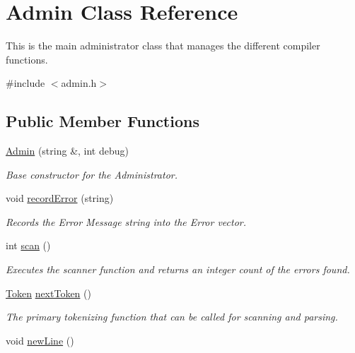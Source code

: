 \hypertarget{classAdmin}{
\section{Admin Class Reference}
\label{classAdmin}
}


This is the main administrator class that manages the different compiler functions.  




{\ttfamily \#include $<$admin.h$>$}

\subsection*{Public Member Functions}
\begin{DoxyCompactItemize}
\item 
\hyperlink{classAdmin_a1483f37673aa04863e86a37b8c493733}{Admin} (string \&, int debug)
\begin{DoxyCompactList}\small\item\em Base constructor for the Administrator. \item\end{DoxyCompactList}\item 
void \hyperlink{classAdmin_a6519bde7fd1ffd997a66987c2417d7bd}{recordError} (string)
\begin{DoxyCompactList}\small\item\em Records the Error Message string into the Error vector. \item\end{DoxyCompactList}\item 
int \hyperlink{classAdmin_aaa4f711e8151dceab8d90c5f127c6820}{scan} ()
\begin{DoxyCompactList}\small\item\em Executes the scanner function and returns an integer count of the errors found. \item\end{DoxyCompactList}\item 
\hyperlink{classToken}{Token} \hyperlink{classAdmin_a7d32bf0c9bcc29be8f622e9b07cfb3d8}{nextToken} ()
\begin{DoxyCompactList}\small\item\em The primary tokenizing function that can be called for scanning and parsing. \item\end{DoxyCompactList}\item 
void \hyperlink{classAdmin_ae121a9ce2a34ac4075d074c2d1f306c5}{newLine} ()

\end{DoxyCompactItemize}
